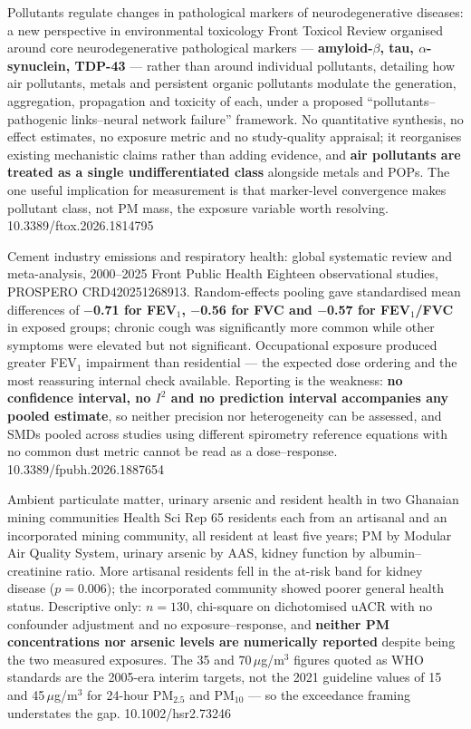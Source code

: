 \documentclass[10pt]{article}
\begin{document}
{Pollutants regulate changes in pathological markers of neurodegenerative diseases: a new
perspective in environmental toxicology}
{Front Toxicol}
{Review organised around core neurodegenerative pathological markers ---
\textbf{amyloid-$\beta$, tau, $\alpha$-synuclein, TDP-43} --- rather than around individual
pollutants, detailing how air pollutants, metals and persistent organic pollutants modulate
the generation, aggregation, propagation and toxicity of each, under a proposed
``pollutants--pathogenic links--neural network failure'' framework. No quantitative
synthesis, no effect estimates, no exposure metric and no study-quality appraisal; it
reorganises existing mechanistic claims rather than adding evidence, and \textbf{air
pollutants are treated as a single undifferentiated class} alongside metals and POPs. The
one useful implication for measurement is that marker-level convergence makes pollutant
class, not PM mass, the exposure variable worth resolving.}
{10.3389/ftox.2026.1814795}


{Cement industry emissions and respiratory health: global systematic review and
meta-analysis, 2000--2025}
{Front Public Health}
{Eighteen observational studies, PROSPERO CRD420251268913. Random-effects pooling gave
standardised mean differences of \textbf{$-$0.71 for FEV$_1$, $-$0.56 for FVC and $-$0.57
for FEV$_1$/FVC} in exposed groups; chronic cough was significantly more common while
other symptoms were elevated but not significant. Occupational exposure produced greater
FEV$_1$ impairment than residential --- the expected dose ordering and the most reassuring
internal check available. Reporting is the weakness: \textbf{no confidence interval, no
$I^2$ and no prediction interval accompanies any pooled estimate}, so neither precision
nor heterogeneity can be assessed, and SMDs pooled across studies using different
spirometry reference equations with no common dust metric cannot be read as a
dose--response.}
{10.3389/fpubh.2026.1887654}

{Ambient particulate matter, urinary arsenic and resident health in two Ghanaian mining
communities}
{Health Sci Rep}
{65 residents each from an artisanal and an incorporated mining community, all resident
at least five years; PM by Modular Air Quality System, urinary arsenic by AAS, kidney
function by albumin--creatinine ratio. More artisanal residents fell in the at-risk band
for kidney disease ($p = 0.006$); the incorporated community showed poorer general health
status. Descriptive only: $n = 130$, chi-square on dichotomised uACR with no confounder
adjustment and no exposure--response, and \textbf{neither PM concentrations nor arsenic
levels are numerically reported} despite being the two measured exposures. The 35 and
70\,$\mu$g/m$^3$ figures quoted as WHO standards are the 2005-era interim targets, not
the 2021 guideline values of 15 and 45\,$\mu$g/m$^3$ for 24-hour PM$_{2.5}$ and
PM$_{10}$ --- so the exceedance framing understates the gap.}
{10.1002/hsr2.73246}
\end{document}
